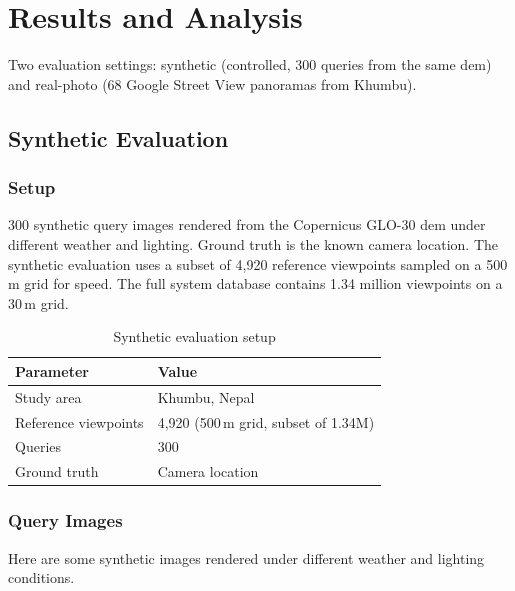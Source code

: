 \chapter{Results and Analysis}
\label{chap:results}

Two evaluation settings: synthetic (controlled, 300 queries from the same \Gls{dem}) and real-photo (68 Google Street View panoramas from Khumbu).

\section{Synthetic Evaluation}

\subsection{Setup}

300 synthetic query images rendered from the Copernicus GLO-30 \Gls{dem} under different weather and lighting. Ground truth is the known camera location. The synthetic evaluation uses a subset of 4{,}920 reference viewpoints sampled on a 500\,m grid for speed. The full system database contains 1.34 million viewpoints on a 30\,m grid.

\begin{table}[H]
\centering
\caption{Synthetic evaluation setup}
\label{tab:evaluation_setup_results}
\begin{tabular}{ll}
\toprule
\textbf{Parameter} & \textbf{Value} \\
\midrule
Study area & Khumbu, Nepal \\
Reference viewpoints & 4{,}920 (500\,m grid, subset of 1.34M) \\
Queries & 300 \\
Ground truth & Camera location \\
\bottomrule
\end{tabular}
\end{table}

\subsection{Query Images}

Here are some synthetic images rendered under different weather and lighting conditions.

